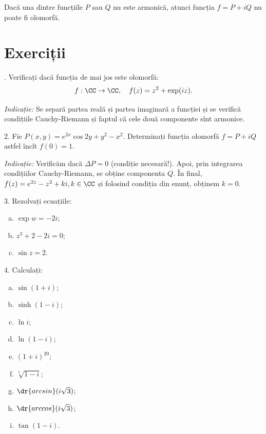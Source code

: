 \begin{corollary}\label{cor:not-olo}
  Dacă una dintre funcțiile $ P $ sau $ Q $ nu este armonică, atunci funcția
  $ f = P + iQ $ nu poate fi olomorfă.
\end{corollary}


\section{Exerciții}

\indent{}. Verificați dacă funcția de mai jos este olomorfă:
\[
  f : \CC \to \CC, \quad f(z) = z^2 + \exp(iz).
\]

\emph{Indicație:} Se separă partea reală și partea imaginară a funcției
și se verifică condițiile Cauchy-Riemann și faptul că cele două componente
sînt armonice.

\vspace{0.3cm}

2. Fie $ P(x, y) = e^{2x}\cos 2y + y^2 - x^2 $. Determinați funcția olomorfă
$ f = P + iQ $ astfel încît $ f(0) = 1 $.

\emph{Indicație:} Verificăm dacă $ \Delta P = 0 $ (condiție necesară!).
Apoi, prin integrarea condițiilor Cauchy-Riemann, se obține componenta
$ Q $. În final, $ f(z) = e^{2z} - z^2 + ki, k \in \CC $ și folosind
condiția din enunț, obținem $ k = 0 $.

\vspace{0.3cm}

3. Rezolvați ecuațiile:
\begin{enumerate}[(a)]
\item $ \exp w = -2i $;
\item $ z^3 + 2 - 2i = 0 $;
\item $ \sin z = 2 $.
\end{enumerate}

\vspace{0.3cm}

4. Calculați:
\begin{enumerate}[(a)]
\item $ \sin(1 + i) $;
\item $ \sinh(1 - i) $;
\item $ \ln i $;
\item $ \ln(1 - i) $;
\item $ (1 + i)^{20} $;
\item $ \sqrt[5]{1 - i} $;
\item $ \dr{arcsin}(i\sqrt{3}) $;
\item $ \dr{arccos}(i\sqrt{3}) $;
\item $ \tan(1 - i) $.
\end{enumerate}

